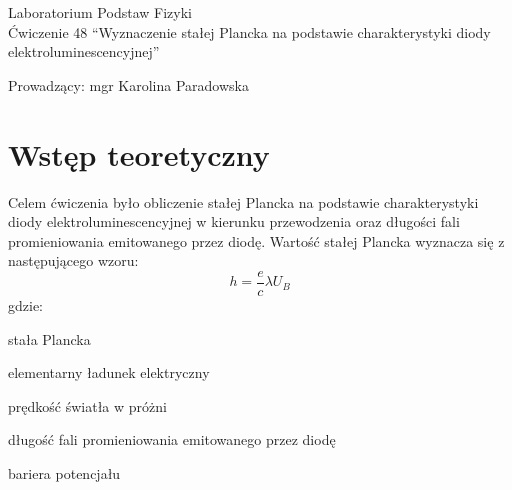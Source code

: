 \documentclass[polish, 11pt, a4paper]{article}
\begin{document}
	\begin{titlepage}
	\centering
	\Huge Laboratorium Podstaw Fizyki\\
	\vspace{1cm}
	\huge Ćwiczenie 48 \enquote{Wyznaczenie stałej Plancka na podstawie charakterystyki diody elektroluminescencyjnej}\\
	\vspace{1cm}
	\raggedright
	\huge Prowadzący: mgr Karolina Paradowska\\
	\vspace{.5cm}
	\begin{table}[h]
		\centering
	\end{table}
	\end{titlepage}
	\section{Wstęp teoretyczny}
		\RaggedRight
		Celem ćwiczenia było obliczenie stałej Plancka na podstawie charakterystyki diody elektroluminescencyjnej w kierunku przewodzenia oraz długości fali promieniowania emitowanego przez diodę.
		Wartość stałej Plancka wyznacza się z następującego wzoru:
		\begin{equation}
			h=\frac{e}{c}\lambda U_B
		\end{equation}
		gdzie:
		\begin{description}[align=right,labelwidth=6cm]
			\item[\(h{[J\cdot s]}\)] stała Plancka
			\item[\(e=1,602\times 10^{-19}{[C]}\)] elementarny ładunek elektryczny
			\item[\(c=299 792 458 {[\frac{m}{s}]}\)] prędkość światła w próżni
			\item[\(\lambda{[m]}\)] długość fali promieniowania emitowanego przez diodę
			\item[\(U_B{[V]}\)] bariera potencjału
		\end{description} 
		
\end{document}
